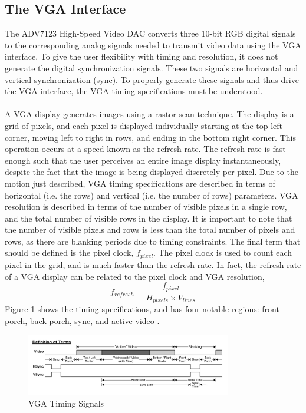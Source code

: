 \documentclass[11pt]{article} %
\begin{document}
\subsection{The VGA Interface}
\label{sec:vga}
The ADV7123 High-Speed Video DAC converts three 10-bit RGB digital signals to the corresponding analog signals needed to transmit video data using the VGA interface. To give the user flexibility with timing and resolution, it does not generate the digital synchronization signals. These two signals are horizontal and vertical synchronization (sync). To properly generate these signals and thus drive the VGA interface, the VGA timing specifications must be understood. \\\\ 
A VGA display generates images using a rastor scan technique. The display is a grid of pixels, and each pixel is displayed individually starting at the top left corner, moving left to right in rows, and ending in the bottom right corner. This operation occurs at a speed known as the refresh rate. The refresh rate is fast enough such that the user perceives an entire image display instantaneously, despite the fact that the image is being displayed discretely per pixel. Due to the motion just described, VGA timing specifications are described in terms of horizontal (i.e. the rows) and vertical (i.e. the number of rows) parameters. VGA resolution is described in terms of the number of visible pixels in a single row, and the total number of visible rows in the display. It is important to note that the number of visible pixels and rows is less than the total number of pixels and rows, as there are blanking periods due to timing constraints. The final term that should be defined is the pixel clock, $f_{pixel}$. The pixel clock is used to count each pixel in the grid, and is much faster than the refresh rate. In fact, the refresh rate of a VGA display can be related to the pixel clock and VGA resolution,
\begin{equation}
f_{refresh} = \frac{f_{pixel}}{H_{pixels} \times V_{lines}}
\end{equation}
 Figure \ref{fig:vgaTiming} shows the timing specifications, and has four notable regions: front porch, back porch, sync, and active video \cite{vga}. 
\begin{figure}[h]
\centering
\includegraphics[width=0.8\textwidth]{./images/vgaTiming.jpg}
\caption{VGA Timing Signals \cite{vga}}
\label{fig:vgaTiming}
\end{figure}
\end{document}
